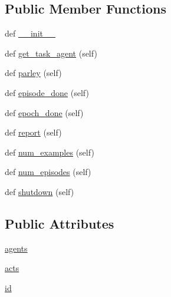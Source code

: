\subsection*{Public Member Functions}
\begin{DoxyCompactItemize}
\item 
def \hyperlink{classparlai_1_1core_1_1worlds_1_1DialogPartnerWorld_a4f9a54febb70ef1f1a015cd3e137fcaa}{\+\_\+\+\_\+init\+\_\+\+\_\+}
\item 
def \hyperlink{classparlai_1_1core_1_1worlds_1_1DialogPartnerWorld_ac3a0c82c725967468208ec10022b6abe}{get\+\_\+task\+\_\+agent} (self)
\item 
def \hyperlink{classparlai_1_1core_1_1worlds_1_1DialogPartnerWorld_a3ae10cae524d87d709e55bc7b2fd8265}{parley} (self)
\item 
def \hyperlink{classparlai_1_1core_1_1worlds_1_1DialogPartnerWorld_a2d18d6d327510401b39e4549540e4ada}{episode\+\_\+done} (self)
\item 
def \hyperlink{classparlai_1_1core_1_1worlds_1_1DialogPartnerWorld_a4cb1a886df2adc8e469d45652264da36}{epoch\+\_\+done} (self)
\item 
def \hyperlink{classparlai_1_1core_1_1worlds_1_1DialogPartnerWorld_a7cf7d09efbe302c30e885641a0189ae8}{report} (self)
\item 
def \hyperlink{classparlai_1_1core_1_1worlds_1_1DialogPartnerWorld_aa925a37ec5968d137faf044279943e6a}{num\+\_\+examples} (self)
\item 
def \hyperlink{classparlai_1_1core_1_1worlds_1_1DialogPartnerWorld_ab34285faaee3830fbf1d9d53869ec47c}{num\+\_\+episodes} (self)
\item 
def \hyperlink{classparlai_1_1core_1_1worlds_1_1DialogPartnerWorld_a281de2cc19b4f7c07ddd51d7c213f3ea}{shutdown} (self)
\end{DoxyCompactItemize}
\subsection*{Public Attributes}
\begin{DoxyCompactItemize}
\item 
\hyperlink{classparlai_1_1core_1_1worlds_1_1DialogPartnerWorld_a04185d1d55ca86c96c796f12f2226fc9}{agents}
\item 
\hyperlink{classparlai_1_1core_1_1worlds_1_1DialogPartnerWorld_ab20044fc960066ca7e04bc4cf580a2be}{acts}
\item 
\hyperlink{classparlai_1_1core_1_1worlds_1_1DialogPartnerWorld_a7b3dc60816b628d1e358521b23d50e2c}{id}
\end{DoxyCompactItemize}
